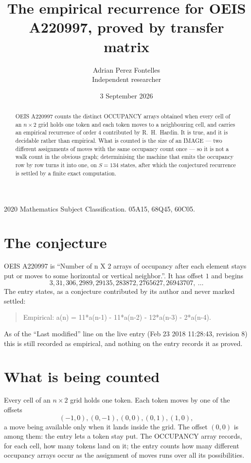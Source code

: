 \documentclass[11pt,a4paper]{article}
\title{The empirical recurrence for OEIS A220997, proved by transfer matrix}
\author{Adrian Perez Fontelles\\ \small Independent researcher}
\date{3 September 2026}
\theoremstyle{plain}
\theoremstyle{definition}
\begin{document}
\maketitle

\begin{abstract}
OEIS A220997 counts the distinct OCCUPANCY arrays obtained when every cell of an $n\times2$ grid
holds one token and each token moves to a neighbouring cell, and carries an empirical
recurrence of order $4$ contributed by R.~H.~Hardin. It is true, and it is decidable
rather than empirical. What is counted is the size of an IMAGE --- two different assignments of
moves with the same occupancy count once --- so it is not a walk count in the obvious graph;
determinising the machine that emits the occupancy row by row turns it into one, on $S=134$
states, after which the conjectured recurrence is settled by a finite exact computation.
\end{abstract}

\noindent\small 2020 Mathematics Subject Classification. 05A15, 68Q45, 60C05.\normalsize

\section{The conjecture}

OEIS A220997 is ``Number of n X 2 arrays of occupancy after each element stays put or moves to some horizontal or vertical neighbor.''. It has offset $1$ and begins
\[
3, 31, 306, 2989, 29135, 283872, 2765627, 26943707,\ \dots
\]
The entry states, as a conjecture contributed by its author and never marked settled:
\begin{quote}
Empirical: a(n) = 11*a(n-1) - 11*a(n-2) - 12*a(n-3) - 2*a(n-4).
\end{quote}
As of the ``Last modified'' line on the live entry (Feb 23 2018 11:28:43, revision 8) this is still
recorded as empirical, and nothing on the entry records it as proved.

\section{What is being counted}

Every cell of an $n\times2$ grid holds one token. Each token moves by one of the offsets
\[
(-1,0), (0,-1), (0,0), (0,1), (1,0),
\]
a move being available only when it lands inside the grid. The offset $(0,0)$ is among them: the entry lets a token stay put. The OCCUPANCY array
records, for each cell, how many tokens land on it; the entry counts how many different
occupancy arrays occur as the assignment of moves runs over all its possibilities.
\end{document}
